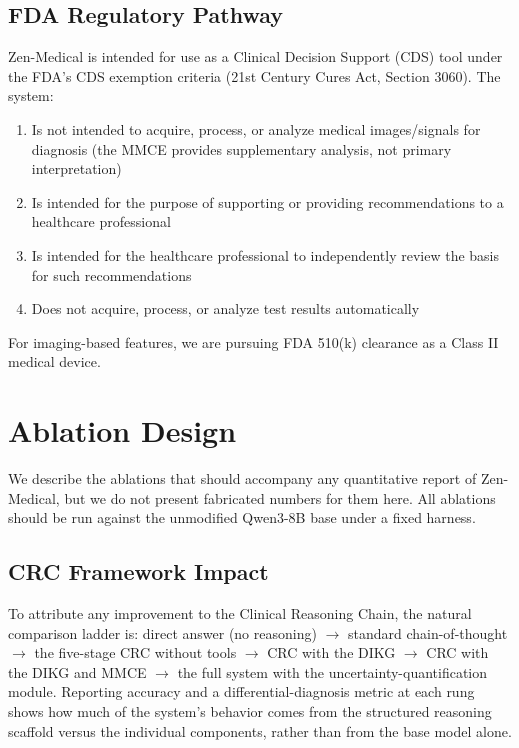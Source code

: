 \documentclass[11pt,a4paper]{article}
\begin{document}
\subsection{FDA Regulatory Pathway}

Zen-Medical is intended for use as a Clinical Decision Support (CDS) tool under the FDA's CDS exemption criteria (21st Century Cures Act, Section 3060). The system:
\begin{enumerate}
    \item Is not intended to acquire, process, or analyze medical images/signals for diagnosis (the MMCE provides supplementary analysis, not primary interpretation)
    \item Is intended for the purpose of supporting or providing recommendations to a healthcare professional
    \item Is intended for the healthcare professional to independently review the basis for such recommendations
    \item Does not acquire, process, or analyze test results automatically
\end{enumerate}

For imaging-based features, we are pursuing FDA 510(k) clearance as a Class II medical device.

\section{Ablation Design}
\label{sec:ablation}

We describe the ablations that should accompany any quantitative report of Zen-Medical, but we do not present fabricated numbers for them here. All ablations should be run against the unmodified Qwen3-8B base under a fixed harness.

\subsection{CRC Framework Impact}

To attribute any improvement to the Clinical Reasoning Chain, the natural comparison ladder is: direct answer (no reasoning) $\rightarrow$ standard chain-of-thought $\rightarrow$ the five-stage CRC without tools $\rightarrow$ CRC with the DIKG $\rightarrow$ CRC with the DIKG and MMCE $\rightarrow$ the full system with the uncertainty-quantification module. Reporting accuracy and a differential-diagnosis metric at each rung shows how much of the system's behavior comes from the structured reasoning scaffold versus the individual components, rather than from the base model alone.
\end{document}
